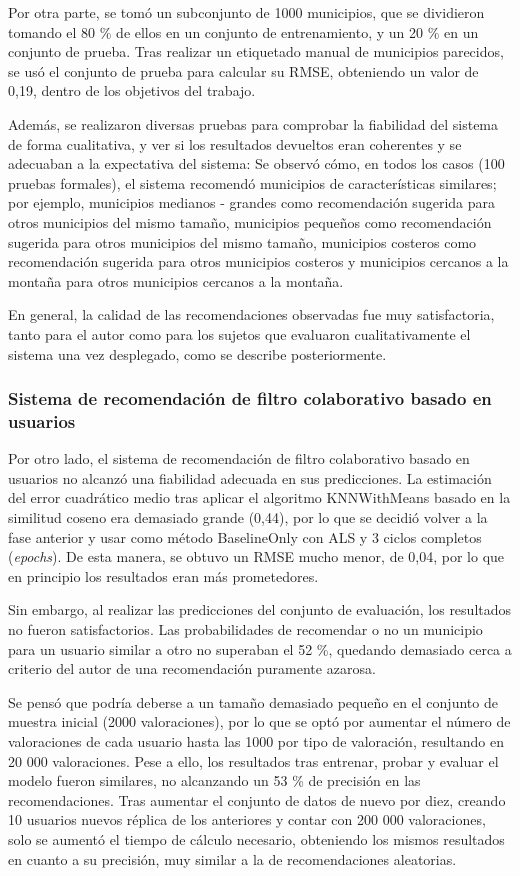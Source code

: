 Por otra parte, se tomó un subconjunto de 1000 municipios, que se dividieron tomando el 80 \% de ellos en un conjunto de entrenamiento, y un 20 \% en un conjunto de prueba. Tras realizar un etiquetado manual de municipios parecidos, se usó el conjunto de prueba para calcular su RMSE, obteniendo un valor de 0,19, dentro de los objetivos del trabajo.

Además, se realizaron diversas pruebas para comprobar la fiabilidad del sistema de forma cualitativa, y ver si los resultados devueltos eran coherentes y se adecuaban a la expectativa del sistema: Se observó cómo, en todos los casos (100 pruebas formales), el sistema recomendó municipios de características similares; por ejemplo, municipios medianos - grandes como recomendación sugerida para otros municipios del mismo tamaño, municipios pequeños como recomendación sugerida para otros municipios del mismo tamaño, municipios costeros como recomendación sugerida para otros municipios costeros y municipios cercanos a la montaña para otros municipios cercanos a la montaña.

En general, la calidad de las recomendaciones observadas fue muy satisfactoria, tanto para el autor como para los sujetos que evaluaron cualitativamente el sistema una vez desplegado, como se describe posteriormente.

\subsubsection{Sistema de recomendación de filtro colaborativo basado en usuarios}

Por otro lado, el sistema de recomendación de filtro colaborativo basado en usuarios no alcanzó una fiabilidad adecuada en sus predicciones. La estimación del error cuadrático medio tras aplicar el algoritmo KNNWithMeans basado en la similitud coseno era demasiado grande (0,44), por lo que se decidió volver a la fase anterior y usar como método BaselineOnly con ALS y 3 ciclos completos (\textit{epochs}). De esta manera, se obtuvo un RMSE mucho menor, de 0,04, por lo que en principio los resultados eran más prometedores.

Sin embargo, al realizar las predicciones del conjunto de evaluación, los resultados no fueron satisfactorios. Las probabilidades de recomendar o no un municipio para un usuario similar a otro no superaban el 52 \%, quedando demasiado cerca a criterio del autor de una recomendación puramente azarosa.

Se pensó que podría deberse a un tamaño demasiado pequeño en el conjunto de muestra inicial (2000 valoraciones), por lo que se optó por aumentar el número de valoraciones de cada usuario hasta las 1000 por tipo de valoración, resultando en 20 000 valoraciones. Pese a ello, los resultados tras entrenar, probar y evaluar el modelo fueron similares, no alcanzando un 53 \% de precisión en las recomendaciones. Tras aumentar el conjunto de datos de nuevo por diez, creando 10 usuarios nuevos réplica de los anteriores y contar con 200 000 valoraciones, solo se aumentó el tiempo de cálculo necesario, obteniendo los mismos resultados en cuanto a su precisión, muy similar a la de recomendaciones aleatorias.

